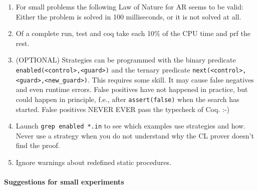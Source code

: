 \documentclass{article}
\begin{document}
\begin{enumerate}
\item For small problems the following Law of Nature for AR seems to
  be valid: Either the problem is solved in 100 milliseconds, or it is
  not solved at all.
\item Of a complete run, test and coq take each 10\% of the CPU time
  and prf the rest.
\item (OPTIONAL) Strategies can be programmed with the binary predicate
  \texttt{enabled(<control>,<guard>)} and the ternary predicate
  \texttt{next(<control>,<guard>,<new\_guard>)}. This requires some
  skill. It may cause false negatives and even runtime errors. False
  positives have not happened in practice, but could happen in
  principle, f.e., after \texttt{assert(false)} when the search has
  started.  False positives NEVER EVER pass the typecheck of Coq. :-)
 \item Launch \texttt{grep enabled *.in} to see which examples use
   strategies and how. Never use a strategy when you do not understand
   why the CL prover doesn't find the proof.
\item Ignore warnings about redefined static procedures.
\end{enumerate}

\paragraph{Suggestions for small experiments}
\end{document}
